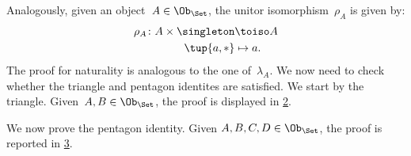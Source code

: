 \begin{example}
    \begin{figure}[h!]
        \begin{center}
        \end{center}
        \caption{\label{fig:monoidal_set_unit_nat}}
    \end{figure}

    Analogously, given an object~$A\in \Ob_{\Set}$, the unitor isomorphism~$\rho_A$ is given by:
    \begin{equation*}
        \begin{aligned}
            \rho_A\colon A\times \singleton &\toiso A\\
            \tup{a,\ast}&\mapsto a.
        \end{aligned}
    \end{equation*}
    The proof for naturality is analogous to the one of~$\lambda_A$. We now need to check whether the triangle and pentagon identites are satisfied. We start by the triangle. Given~$A,B\in \Ob_{\Set}$, the proof is displayed in \cref{fig:set_mon_triangle}.

    \begin{figure}[h]
        \begin{center}
        \end{center}
        \caption{\label{fig:set_mon_triangle}}
    \end{figure}

    We now prove the pentagon identity. Given $A,B,C,D\in \Ob_\Set$, the proof is reported in \cref{fig:set_mon_pent}.


    \begin{figure}[h]
        \begin{center}
        \end{center}
        \caption{\label{fig:set_mon_pent}}
    \end{figure}
\end{example}



